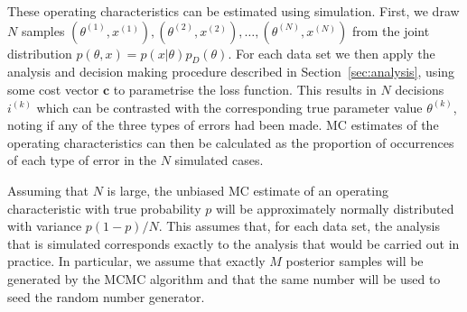 \documentclass{article} %
\begin{document}
These operating characteristics can be estimated using simulation. First, we draw $N$ samples $(\theta^{(1)}, x^{(1)}), (\theta^{(2)}, x^{(2)}), \ldots , (\theta^{(N)}, x^{(N)})$ from the joint distribution $p(\theta, x) = p(x | \theta)p_D(\theta)$. For each data set we then apply the analysis and decision making procedure described in Section~\ref{sec:analysis}, using some cost vector $\mathbf{c}$ to parametrise the loss function. This results in $N$ decisions $i^{(k)}$ which can be contrasted with the corresponding true parameter value $\theta^{(k)}$, noting if any of the three types of errors had been made. MC estimates of the operating characteristics can then be calculated as the proportion of occurrences of each type of error in the $N$ simulated cases.

Assuming that $N$ is large, the unbiased MC estimate of an operating characteristic with true probability $p$ will be approximately normally distributed with variance $p(1-p)/N$. This assumes that, for each data set, the analysis that is simulated corresponds exactly to the analysis that would be carried out in practice. In particular, we assume that exactly $M$ posterior samples will be generated by the MCMC algorithm and that the same number will be used to seed the random number generator. 
\end{document}
